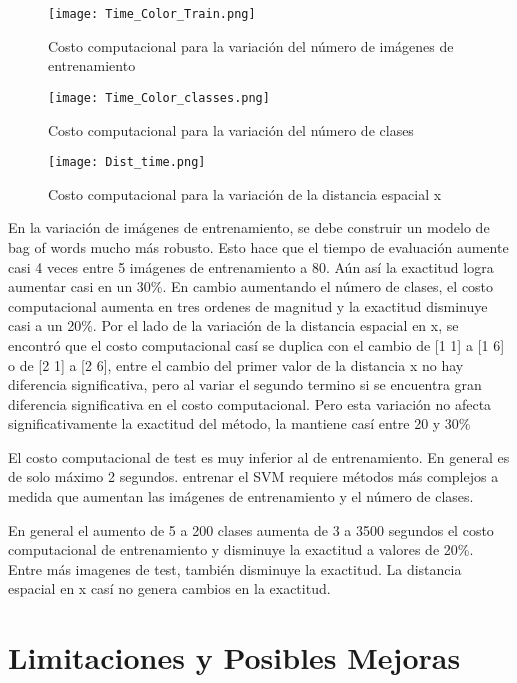 \documentclass[10pt,twocolumn,letterpaper]{article}
\begin{document}
\begin{figure}[ht]
\centering

 \texttt{[image: Time\_Color\_Train.png]}
\caption{Costo computacional para la variación del número de imágenes de entrenamiento}
\end{figure}

\begin{figure}[ht]
\centering

 \texttt{[image: Time\_Color\_classes.png]}
\caption{Costo computacional para la variación del número de clases}
\end{figure}
\begin{figure}[ht]
\centering
 \texttt{[image: Dist\_time.png]}
\caption{Costo computacional para la variación de la distancia espacial x}
\end{figure}

En la variación de imágenes de entrenamiento, se debe construir un modelo de bag of words mucho más robusto. Esto hace que el tiempo de evaluación aumente casi 4 veces entre 5 imágenes de entrenamiento a 80. Aún así la exactitud logra aumentar casi en un 30\%. En cambio aumentando el número de clases, el costo computacional aumenta en tres ordenes de magnitud y la exactitud disminuye casi a un 20\%. 
Por el lado de la variación de la distancia espacial en x, se encontró que el costo computacional casí se duplica con el cambio de [1 1] a [1 6] o de [2 1] a [2 6], entre el cambio del primer valor de la distancia x no hay diferencia significativa, pero al variar el segundo termino si se encuentra gran diferencia significativa en el costo computacional. Pero esta variación no afecta significativamente la exactitud del método, la mantiene casí entre 20 y 30\%

El costo computacional de test es muy inferior al de entrenamiento. En general es de solo máximo 2 segundos. entrenar el SVM requiere métodos más complejos a medida que aumentan las imágenes de entrenamiento y el número de clases.

En general el aumento de 5 a 200 clases aumenta de 3 a 3500 segundos el costo computacional de entrenamiento y disminuye la exactitud a valores de 20\%. Entre más imagenes de test, también disminuye la exactitud. La distancia espacial en x casí no genera cambios en la exactitud.  

\section{Limitaciones y Posibles Mejoras}
\end{document}

